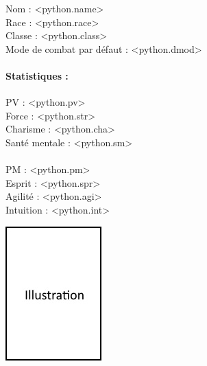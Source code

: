 \begin{multicols}{2}
\begin{minipage}{1.25\linewidth}%
\raggedright
Nom : <python.name> \\[4pt]
Race : <python.race> \\[4pt]
Classe : <python.class> \\[4pt]
Mode de combat par d\'efaut : <python.dmod> \\[4pt]

\paragraph{Statistiques :}
\begin{multicols}{2}%
\setlength{\columnsep}{40pt}
\begin{minipage}{1\linewidth}%
\raggedright
\vskip 4pt
PV : <python.pv> \\[4pt]
Force : <python.str> \\[4pt]
Charisme : <python.cha> \\[4pt]
Sant\'e mentale : <python.sm> \\[4pt]
\end{minipage}%
\columnbreak
\paragraph{}
\begin{minipage}{1\linewidth}%
\raggedright
\vskip 4pt
PM : <python.pm> \\[4pt]
Esprit : <python.spr> \\[4pt]
Agilit\'e : <python.agi> \\[4pt]
Intuition : <python.int> \\[4pt]
\end{minipage}%
\end{multicols}%
\end{minipage}%

\columnbreak

\begin{flushright}
    \includegraphics[scale=1]{empty.jpg}
\end{flushright}

\end{multicols}
